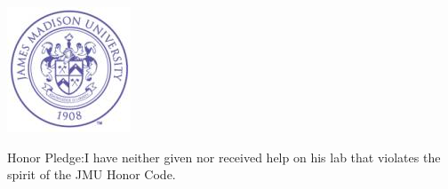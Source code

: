 \documentclass[main.tex]{subfiles}
\begin{document}
\begin{titlepage}
\includegraphics{img/00_seal.jpg}\\[1cm] %
\begin{flushleft} Honor Pledge:I have neither given nor received help on his lab that violates the spirit of the JMU Honor Code.\\[0.4cm]
\end{flushleft}
\begin{adjustbox}{width=1.0\textwidth,center=\textwidth}
\end{adjustbox}
\vfill %
\end{titlepage}
\end{document}
